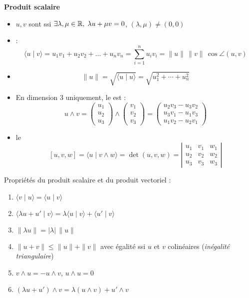 \documentclass[10pt,class=article,crop=false]{standalone}
\begin{document}
\begin{multicols}{2}
\textbf{Produit scalaire}

\begin{itemize}
	\item \(u,v\) sont  ssi $\exists \lambda,\mu \in \mathbb{R} , \; \lambda u + \mu v = 0$,
\( (\lambda,\mu) \neq (0,0) \)

    \item {} :
\[
 \langle u \mid v \rangle 
= u_1 v_1 + u_2 v_2 + \dots + u_n v_n = \sum_{i=1}^n u_i v_i
= \| u \| \, \|v\| \, \cos \angle(u,v)
\]

    \item 
{}
\[
\| u \| = \sqrt{\langle u \mid u \rangle} = \sqrt{u_1^2 + \cdots + u_n^2}
\]

  \item En dimension 3 uniquement, le  est : 
\[u \wedge v = \begin{pmatrix} u_1 \\ u_2 \\ u_3 \end{pmatrix} \wedge \begin{pmatrix} v_1 \\ v_2 \\ v_3 \end{pmatrix}
= \begin{pmatrix} u_2 v_3 - u_3 v_2 \\ u_3 v_1 - u_1 v_3 \\ u_1 v_2 - u_2 v_1 \end{pmatrix}
\]
  
  \item le 
  \[  
  [u,v,w] = \langle u \mid v \wedge w \rangle = \det (u,v,w)
  = \left| \begin{matrix}
  	u_1 & v_1 & w_1 \\ u_2 & v_2 & w_2 \\ u_3 & v_3 & w_3 
  \end{matrix} \right|
  \]
  
\end{itemize}


Propriétés du produit scalaire et du produit vectoriel :
 \begin{enumerate}
 \item \( \langle v \mid u \rangle = \langle u \mid v \rangle \)
 \item \( \langle \lambda u + u' \mid v \rangle = \lambda \langle u \mid v \rangle + \langle u' \mid v \rangle \)
 \item \( \| \lambda u \| = |\lambda| \, \| u \| \) 
 \item \( \| u + v \| \leq \| u \| + \| v \| \) avec égalité ssi \(u\) et \(v\) colinéaires (\emph{inégalité triangulaire})
 \item \( v \wedge u = - u \wedge v \), \( u\wedge u = 0 \)
 \item \( (\lambda u + u') \wedge v = \lambda (u \wedge v) + u' \wedge v \)
 \end{enumerate}




\end{multicols}
\end{document}
